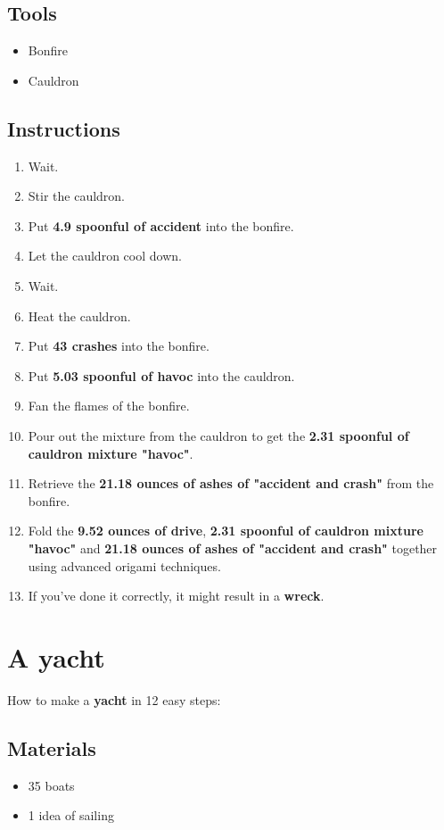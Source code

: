 \documentclass{article}
\begin{document}
\subsection{Tools}\begin{itemize}
\item 
Bonfire
\item 
Cauldron
\end{itemize}
\subsection{Instructions}\begin{enumerate}
\item 
Wait.
\item 
Stir the cauldron.
\item 
Put \textbf{4.9 spoonful of accident} into the bonfire.
\item 
Let the cauldron cool down.
\item 
Wait.
\item 
Heat the cauldron.
\item 
Put \textbf{43 crashes} into the bonfire.
\item 
Put \textbf{5.03 spoonful of havoc} into the cauldron.
\item 
Fan the flames of the bonfire.
\item 
Pour out the mixture from the cauldron to get the \textbf{2.31 spoonful of cauldron mixture "havoc"}.
\item 
Retrieve the \textbf{21.18 ounces of ashes of "accident and crash"} from the bonfire.
\item 
Fold the \textbf{9.52 ounces of drive}, \textbf{2.31 spoonful of cauldron mixture "havoc"} and \textbf{21.18 ounces of ashes of "accident and crash"} together using advanced origami techniques.
\item 
If you've done it correctly, it might result in a \textbf{wreck}.
\end{enumerate}
\newpage
\section{A yacht}How to make a \textbf{yacht} in 12 easy steps:

\subsection{Materials}\begin{itemize}
\item 
35 boats
\item 
1 idea of sailing
\end{itemize}
\end{document}
